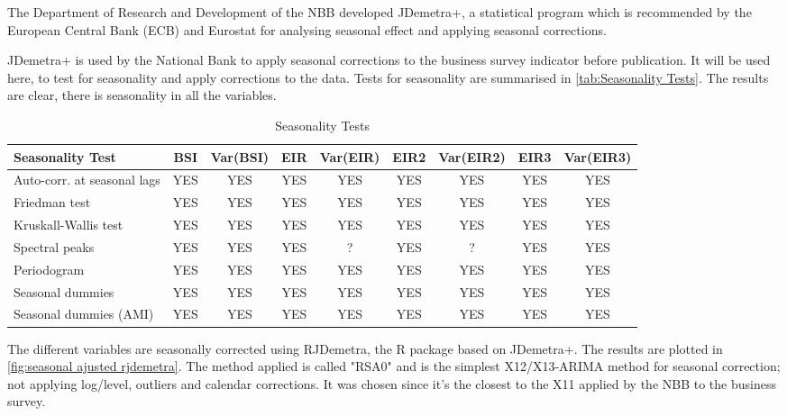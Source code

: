 \documentclass[12pt,a4paper,oneside]{book}
\begin{document}
The Department of Research and Development of the NBB developed JDemetra+, a statistical program which is recommended by the European Central Bank (ECB) and Eurostat for analysing seasonal effect and applying seasonal corrections. 

JDemetra+ is used by the National Bank to apply seasonal corrections to the business survey indicator before publication. It will be used here, to test for seasonality and apply corrections to the data.
Tests for seasonality are summarised in \autoref{tab:Seasonality Tests}. The results are clear, there is seasonality in all the variables.


\begin{table}[htp!]
    \caption{Seasonality Tests}
    \label{tab:Seasonality Tests}
    \centering \footnotesize
    \begin{tabular}{l|c|c|c|c|c|c|c|c}
\textbf{Seasonality Test} & BSI & Var(BSI) & EIR & Var(EIR) & EIR2 & Var(EIR2) & EIR3 & Var(EIR3) \\ \hline
Auto-corr. at seasonal lags& YES & YES & YES & YES & YES & YES & YES & YES \\
Friedman test       & YES   & YES & YES & YES & YES & YES & YES & YES \\
Kruskall-Wallis test & YES   & YES & YES & YES & YES & YES & YES & YES \\
Spectral peaks                  & YES   & YES & YES & ? & YES & ? & YES & YES \\
Periodogram                     & YES   & YES & YES & YES & YES & YES & YES & YES \\
Seasonal dummies                & YES   & YES & YES & YES & YES & YES & YES & YES \\
Seasonal dummies (AMI)          & YES   & YES & YES & YES & YES & YES & YES & YES \\
    \end{tabular}
\end{table}



The different variables are seasonally corrected using RJDemetra, the R package based on JDemetra+.
The results are plotted in \autoref{fig:seasonal ajusted rjdemetra}.
The method applied is called "RSA0" and is the simplest X12/X13-ARIMA method for seasonal correction; not applying log/level, outliers and calendar corrections.
It was chosen since it's the closest to the X11 applied by the NBB to the business survey.
\end{document}
